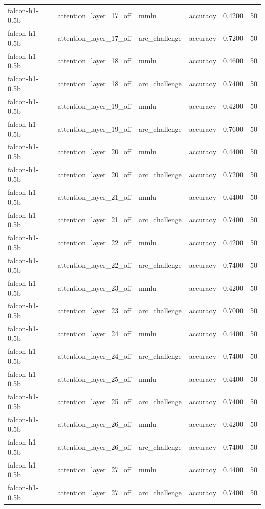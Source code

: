 \begin{tabular}{llllrr}
falcon-h1-0.5b & attention_layer_17_off & mmlu & accuracy & 0.4200 & 50 \\
falcon-h1-0.5b & attention_layer_17_off & arc_challenge & accuracy & 0.7200 & 50 \\
falcon-h1-0.5b & attention_layer_18_off & mmlu & accuracy & 0.4600 & 50 \\
falcon-h1-0.5b & attention_layer_18_off & arc_challenge & accuracy & 0.7400 & 50 \\
falcon-h1-0.5b & attention_layer_19_off & mmlu & accuracy & 0.4200 & 50 \\
falcon-h1-0.5b & attention_layer_19_off & arc_challenge & accuracy & 0.7600 & 50 \\
falcon-h1-0.5b & attention_layer_20_off & mmlu & accuracy & 0.4400 & 50 \\
falcon-h1-0.5b & attention_layer_20_off & arc_challenge & accuracy & 0.7200 & 50 \\
falcon-h1-0.5b & attention_layer_21_off & mmlu & accuracy & 0.4400 & 50 \\
falcon-h1-0.5b & attention_layer_21_off & arc_challenge & accuracy & 0.7400 & 50 \\
falcon-h1-0.5b & attention_layer_22_off & mmlu & accuracy & 0.4200 & 50 \\
falcon-h1-0.5b & attention_layer_22_off & arc_challenge & accuracy & 0.7400 & 50 \\
falcon-h1-0.5b & attention_layer_23_off & mmlu & accuracy & 0.4200 & 50 \\
falcon-h1-0.5b & attention_layer_23_off & arc_challenge & accuracy & 0.7000 & 50 \\
falcon-h1-0.5b & attention_layer_24_off & mmlu & accuracy & 0.4400 & 50 \\
falcon-h1-0.5b & attention_layer_24_off & arc_challenge & accuracy & 0.7400 & 50 \\
falcon-h1-0.5b & attention_layer_25_off & mmlu & accuracy & 0.4400 & 50 \\
falcon-h1-0.5b & attention_layer_25_off & arc_challenge & accuracy & 0.7400 & 50 \\
falcon-h1-0.5b & attention_layer_26_off & mmlu & accuracy & 0.4200 & 50 \\
falcon-h1-0.5b & attention_layer_26_off & arc_challenge & accuracy & 0.7400 & 50 \\
falcon-h1-0.5b & attention_layer_27_off & mmlu & accuracy & 0.4400 & 50 \\
falcon-h1-0.5b & attention_layer_27_off & arc_challenge & accuracy & 0.7400 & 50 \\

\end{tabular}
